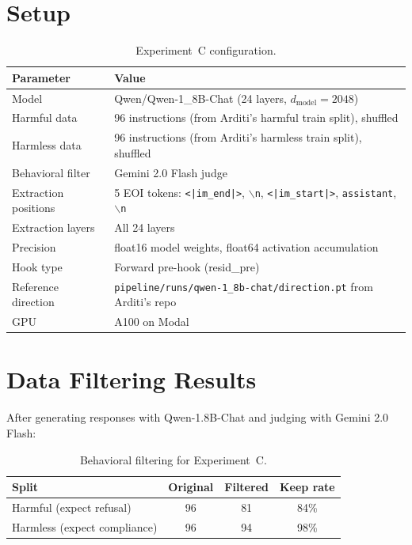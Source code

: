 \documentclass[11pt,a4paper]{article}
\begin{document}
\section{Setup}

\begin{table}[H]\centering
\caption{Experiment~C configuration.}
\begin{tabular}{ll}
\toprule
\textbf{Parameter} & \textbf{Value} \\
\midrule
Model & Qwen/Qwen-1\_8B-Chat (24 layers, $d_\text{model}=2048$) \\
Harmful data & 96 instructions (from Arditi's harmful train split), shuffled \\
Harmless data & 96 instructions (from Arditi's harmless train split), shuffled \\
Behavioral filter & Gemini 2.0 Flash judge \\
Extraction positions & 5 EOI tokens: \texttt{<|im\_end|>}, \texttt{$\backslash$n}, \texttt{<|im\_start|>}, \texttt{assistant}, \texttt{$\backslash$n} \\
Extraction layers & All 24 layers \\
Precision & float16 model weights, float64 activation accumulation \\
Hook type & Forward pre-hook (resid\_pre) \\
Reference direction & \texttt{pipeline/runs/qwen-1\_8b-chat/direction.pt} from Arditi's repo \\
GPU & A100 on Modal \\
\bottomrule
\end{tabular}
\end{table}

\section{Data Filtering Results}

After generating responses with Qwen-1.8B-Chat and judging with Gemini 2.0 Flash:

\begin{table}[H]\centering
\caption{Behavioral filtering for Experiment~C.}
\begin{tabular}{lccc}
\toprule
\textbf{Split} & \textbf{Original} & \textbf{Filtered} & \textbf{Keep rate} \\
\midrule
Harmful (expect refusal) & 96 & 81 & 84\% \\
Harmless (expect compliance) & 96 & 94 & 98\% \\
\bottomrule
\end{tabular}
\end{table}
\end{document}
